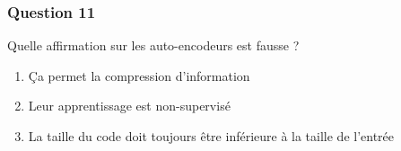 \documentclass{formation}
\begin{document}
\begin{frame}
  \frametitle{Question 11}
  Quelle affirmation sur les auto-encodeurs est fausse ?
  \begin{enumerate}
  \item Ça permet la compression d'information
  \item Leur apprentissage est non-supervisé
  \item La taille du code doit toujours  être inférieure à la taille de l'entrée
  \end{enumerate}
\end{frame}
\end{document}
